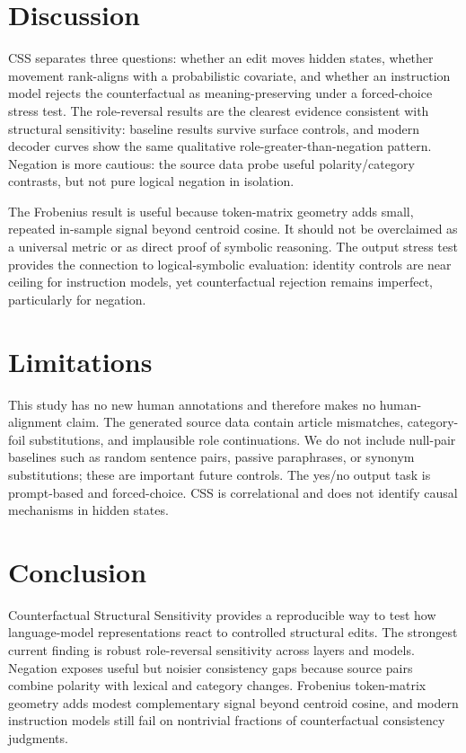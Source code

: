 \documentclass{article}
\begin{document}
\section{Discussion}

CSS separates three questions: whether an edit moves hidden states, whether movement rank-aligns with a probabilistic covariate, and whether an instruction model rejects the counterfactual as meaning-preserving under a forced-choice stress test. The role-reversal results are the clearest evidence consistent with structural sensitivity: baseline results survive surface controls, and modern decoder curves show the same qualitative role-greater-than-negation pattern. Negation is more cautious: the source data probe useful polarity/category contrasts, but not pure logical negation in isolation.

The Frobenius result is useful because token-matrix geometry adds small, repeated in-sample signal beyond centroid cosine. It should not be overclaimed as a universal metric or as direct proof of symbolic reasoning. The output stress test provides the connection to logical-symbolic evaluation: identity controls are near ceiling for instruction models, yet counterfactual rejection remains imperfect, particularly for negation.

\section{Limitations}

This study has no new human annotations and therefore makes no human-alignment claim. The generated source data contain article mismatches, category-foil substitutions, and implausible role continuations. We do not include null-pair baselines such as random sentence pairs, passive paraphrases, or synonym substitutions; these are important future controls. The yes/no output task is prompt-based and forced-choice. CSS is correlational and does not identify causal mechanisms in hidden states.

\section{Conclusion}

Counterfactual Structural Sensitivity provides a reproducible way to test how language-model representations react to controlled structural edits. The strongest current finding is robust role-reversal sensitivity across layers and models. Negation exposes useful but noisier consistency gaps because source pairs combine polarity with lexical and category changes. Frobenius token-matrix geometry adds modest complementary signal beyond centroid cosine, and modern instruction models still fail on nontrivial fractions of counterfactual consistency judgments.
\end{document}
